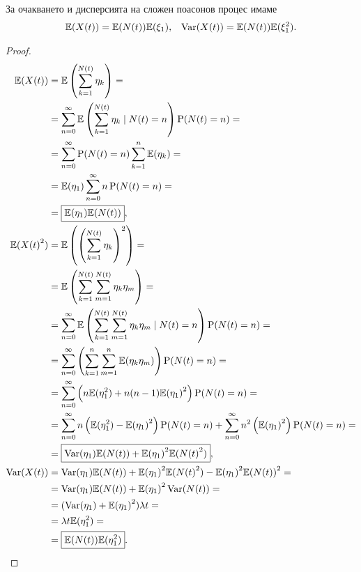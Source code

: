 \documentclass[numbers=endperiod, bibliography=totocnumbered]{scrartcl}
\begin{document}
\begin{theorem}
  За очакването и дисперсията на сложен поасонов процес имаме
  \begin{align*}
    \mathbb{E}(X(t)) = \mathbb{E}(N(t)) \mathbb{E}(\xi_1),
    &&
    \operatorname{Var}(X(t)) = \mathbb{E}(N(t)) \mathbb{E}(\xi_1^2).
  \end{align*}
\end{theorem}
\begin{proof}
  \begin{align*}
    \mathbb{E}(X(t))
    &=
    \mathbb{E}\left( \sum_{k=1}^{N(t)} \eta_k \right)
    = \\ &=
    \sum_{n=0}^\infty \mathbb{E}\left( \sum_{k=1}^{N(t)} \eta_k \mid N(t) = n \right) \operatorname{P}(N(t) = n)
    = \\ &=
    \sum_{n=0}^\infty \operatorname{P}(N(t) = n) \sum_{k=1}^n \mathbb{E}(\eta_k)
    = \\ &=
    \mathbb{E}(\eta_1) \sum_{n=0}^\infty n \operatorname{P}(N(t) = n)
    = \\ &=
    \boxed{\mathbb{E}(\eta_1) \mathbb{E}(N(t))},
    \\
    \mathbb{E}({X(t)}^2)
    &=
    \mathbb{E}\left( {\left(\sum_{k=1}^{N(t)} \eta_k \right)}^2 \right)
    = \\ &=
    \mathbb{E}\left( \sum_{k=1}^{N(t)} \sum_{m=1}^{N(t)} \eta_k \eta_m \right)
    = \\ &=
    \sum_{n=0}^\infty \mathbb{E}\left( \sum_{k=1}^{N(t)} \sum_{m=1}^{N(t)} \eta_k \eta_m \mid N(t) = n \right) \operatorname{P}(N(t) = n)
    = \\ &=
    \sum_{n=0}^\infty \left( \sum_{k=1}^n \sum_{m=1}^n \mathbb{E}(\eta_k \eta_m) \right) \operatorname{P}(N(t) = n)
    = \\ &=
    \sum_{n=0}^\infty \left( n \mathbb{E}(\eta_1^2) + n (n-1) {\mathbb{E}(\eta_1)}^2 \right) \operatorname{P}(N(t) = n)
    = \\ &=
    \sum_{n=0}^\infty n \left( \mathbb{E}(\eta_1^2) - {\mathbb{E}(\eta_1)}^2 \right) \operatorname{P}(N(t) = n) + \sum_{n=0}^\infty n^2 \left( {\mathbb{E}(\eta_1)}^2 \right) \operatorname{P}(N(t) = n)
    = \\ &=
    \boxed{\operatorname{Var}(\eta_1) \mathbb{E}(N(t)) + {\mathbb{E}(\eta_1)}^2 \mathbb{E}({N(t)}^2)},
    \\
    \operatorname{Var}(X(t))
    &=
    \operatorname{Var}(\eta_1) \mathbb{E}(N(t)) + {\mathbb{E}(\eta_1)}^2 \mathbb{E}({N(t)}^2) - {\mathbb{E}(\eta_1)}^2 {\mathbb{E}(N(t))}^2
    = \\ &=
    \operatorname{Var}(\eta_1) \mathbb{E}(N(t)) + {\mathbb{E}(\eta_1)}^2 \operatorname{Var}(N(t))
    = \\ &=
    (\operatorname{Var}(\eta_1) + {\mathbb{E}(\eta_1)}^2) \lambda t
    = \\ &=
    \lambda t \mathbb{E}(\eta_1^2)
    = \\ &=
    \boxed{\mathbb{E}(N(t)) \mathbb{E}(\eta_1^2)}.
  \end{align*}
\end{proof}
\end{document}

